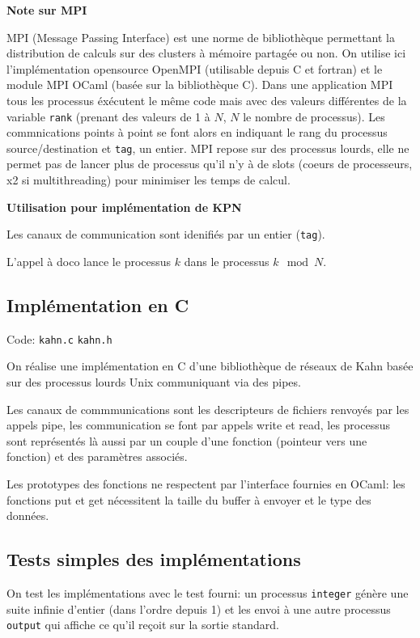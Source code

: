 \documentclass[a4paper]{article}
\begin{document}
\textbf{Note sur MPI}

MPI (Message Passing Interface) est une norme de bibliothèque permettant la distribution de calculs sur des clusters à mémoire partagée ou non. On utilise ici l'implémentation opensource OpenMPI (utilisable depuis C et fortran) et le module MPI OCaml (basée sur la bibliothèque C). Dans une application MPI tous les processus éxécutent le même code mais avec des valeurs différentes de la variable \verb|rank| (prenant des valeurs de 1 à $N$, $N$ le nombre de processus). Les commnications points à point se font alors en indiquant le rang du processus source/destination et \verb|tag|, un entier. MPI repose sur des processus lourds, elle ne permet pas de lancer plus de processus qu'il n'y à de slots (coeurs de processeurs, x2 si multithreading) pour minimiser les temps de calcul.

\textbf{Utilisation pour implémentation de KPN}


Les canaux de communication sont idenifiés par un entier (\verb|tag|).

L'appel à doco lance le processus $k$ dans le processus $k\mod{N}$.


\subsection{Implémentation en C}

Code: \verb|kahn.c| \verb|kahn.h|

On réalise une implémentation en C d'une bibliothèque de réseaux de Kahn basée sur des processus lourds Unix communiquant via des pipes.

Les canaux de commmunications sont les descripteurs de fichiers renvoyés par les appels pipe, les communication se font par appels write et read, les processus sont représentés là aussi par un couple d'une fonction (pointeur vers une fonction) et des paramètres associés.

Les prototypes des fonctions ne respectent par l'interface fournies en OCaml: les fonctions put et get nécessitent la taille du buffer à envoyer et le type des données.

\subsection{Tests simples des implémentations}

On test les implémentations avec le test fourni: un processus \verb|integer| génère une suite infinie d'entier (dans l'ordre depuis 1) et les envoi à une autre processus \verb|output| qui affiche ce qu'il reçoit sur la sortie standard.
\end{document}
